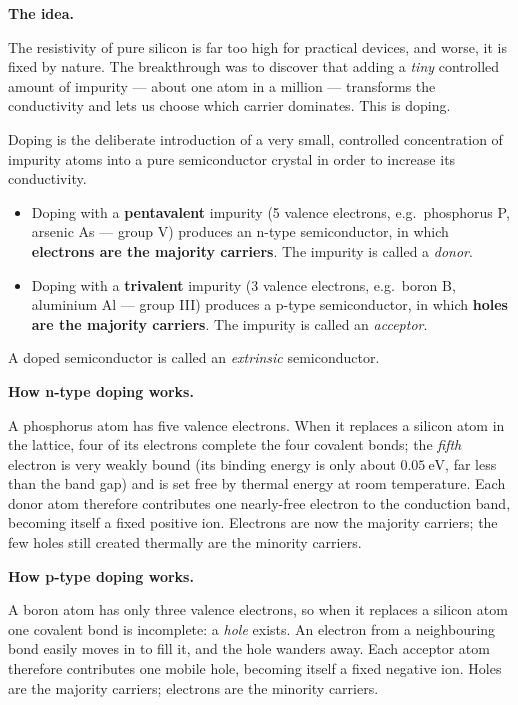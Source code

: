 \documentclass[11pt]{article}
\newcommand{\cle}[1]{{\popxbold\color{popdark}#1}}
\begin{document}
\textbf{The idea.}\par
The resistivity of pure silicon is far too high for practical devices, and worse, it is fixed by nature. The breakthrough was to discover that adding a \emph{tiny} controlled amount of impurity --- about one atom in a million --- transforms the conductivity and lets us choose which carrier dominates. This is \cle{doping}.

\begin{definition}
\cle{Doping} is the deliberate introduction of a very small, controlled concentration of impurity atoms into a pure semiconductor crystal in order to increase its conductivity.
\begin{itemize}
\item Doping with a \textbf{pentavalent} impurity (5 valence electrons, e.g.\ phosphorus P, arsenic As --- group V) produces an \cle{n-type} semiconductor, in which \textbf{electrons are the majority carriers}. The impurity is called a \emph{donor}.
\item Doping with a \textbf{trivalent} impurity (3 valence electrons, e.g.\ boron B, aluminium Al --- group III) produces a \cle{p-type} semiconductor, in which \textbf{holes are the majority carriers}. The impurity is called an \emph{acceptor}.
\end{itemize}
A doped semiconductor is called an \emph{extrinsic} semiconductor.
\end{definition}

\textbf{How n-type doping works.}\par
A phosphorus atom has five valence electrons. When it replaces a silicon atom in the lattice, four of its electrons complete the four covalent bonds; the \emph{fifth} electron is very weakly bound (its binding energy is only about $0.05\ \mathrm{eV}$, far less than the band gap) and is set free by thermal energy at room temperature. Each donor atom therefore contributes one nearly-free electron to the conduction band, becoming itself a fixed positive ion. Electrons are now the \cle{majority carriers}; the few holes still created thermally are the \cle{minority carriers}.

\textbf{How p-type doping works.}\par
A boron atom has only three valence electrons, so when it replaces a silicon atom one covalent bond is incomplete: a \emph{hole} exists. An electron from a neighbouring bond easily moves in to fill it, and the hole wanders away. Each acceptor atom therefore contributes one mobile hole, becoming itself a fixed negative ion. Holes are the majority carriers; electrons are the minority carriers.
\end{document}
